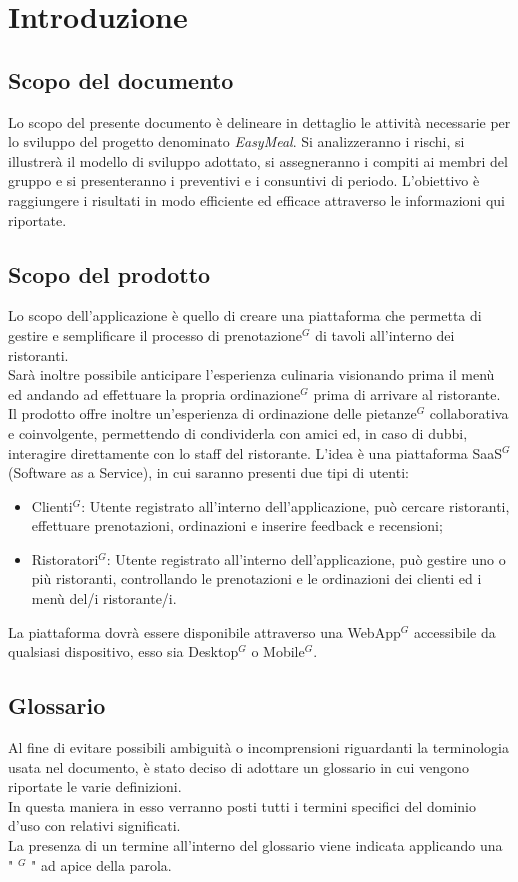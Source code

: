 \section{Introduzione}
\subsection{Scopo del documento}
Lo scopo del presente documento è delineare in dettaglio le attività necessarie per lo sviluppo del progetto denominato \emph{EasyMeal}.
Si analizzeranno i rischi, si illustrerà il modello di sviluppo adottato, si assegneranno i compiti ai membri del gruppo e si presenteranno i preventivi e i consuntivi di periodo.
L'obiettivo è raggiungere i risultati in modo efficiente ed efficace attraverso le informazioni qui riportate.
\subsection{Scopo del prodotto}
Lo scopo dell'applicazione è quello di creare una piattaforma che permetta di gestire e semplificare
il processo di prenotazione$^{G}$ di tavoli all'interno dei ristoranti. \\
Sarà inoltre possibile anticipare l'esperienza culinaria visionando prima il menù ed
andando ad effettuare la propria ordinazione$^{G}$ prima di arrivare al ristorante. \\
Il prodotto offre inoltre un’esperienza di ordinazione delle pietanze$^{G}$ collaborativa e coinvolgente,
permettendo di condividerla con amici ed, in caso di dubbi, interagire direttamente con lo staff del ristorante.
L’idea è una piattaforma SaaS$^{G}$ (Software as a Service), in cui saranno presenti due tipi di utenti:
\begin{itemize}
    \item Clienti$^{G}$: Utente registrato all’interno dell’applicazione, può cercare ristoranti, effettuare prenotazioni, ordinazioni e inserire feedback e recensioni;
    \item Ristoratori$^{G}$: Utente registrato all’interno dell’applicazione, può gestire uno o più ristoranti, controllando le prenotazioni e le ordinazioni dei clienti ed i menù del/i ristorante/i.
\end{itemize}
La piattaforma dovrà essere disponibile attraverso una WebApp$^{G}$ accessibile da qualsiasi dispositivo, esso sia Desktop$^{G}$ o Mobile$^{G}$.
\subsection{Glossario}
Al fine di evitare possibili ambiguità o incomprensioni riguardanti la terminologia usata nel documento, è stato deciso di adottare un glossario in cui vengono riportate le varie definizioni. \\
In questa maniera in esso verranno posti tutti i termini specifici del dominio d’uso con relativi significati. \\
La presenza di un termine all’interno del glossario viene indicata applicando una " $^{G}$ " ad apice della parola.
